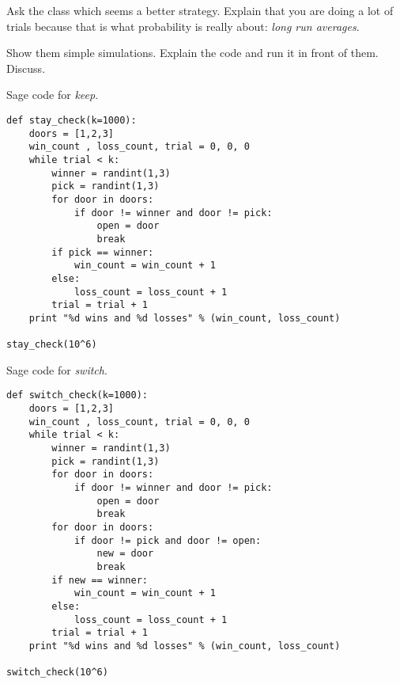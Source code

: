 \documentclass[12pt]{amsart}
\theoremstyle{definition}
\begin{document}
Ask the class which seems a better strategy. 
Explain that you are doing a lot of trials because that is what probability is really about: \emph{long run averages}.

Show them simple simulations. 
Explain the code and run it in front of them. 
Discuss.

Sage code for \emph{keep}.

\begin{verbatim}
def stay_check(k=1000):
    doors = [1,2,3]
    win_count , loss_count, trial = 0, 0, 0
    while trial < k:
        winner = randint(1,3)
        pick = randint(1,3)
        for door in doors:
            if door != winner and door != pick:
                open = door
                break
        if pick == winner:
            win_count = win_count + 1
        else:
            loss_count = loss_count + 1
        trial = trial + 1
    print "%d wins and %d losses" % (win_count, loss_count)

stay_check(10^6)
\end{verbatim}

\clearpage

Sage code for \emph{switch}.

\begin{verbatim}
def switch_check(k=1000):
    doors = [1,2,3]
    win_count , loss_count, trial = 0, 0, 0
    while trial < k:
        winner = randint(1,3)
        pick = randint(1,3)
        for door in doors:
            if door != winner and door != pick:
                open = door
                break
        for door in doors:
            if door != pick and door != open:
                new = door
                break
        if new == winner:
            win_count = win_count + 1
        else:
            loss_count = loss_count + 1
        trial = trial + 1
    print "%d wins and %d losses" % (win_count, loss_count)

switch_check(10^6)
\end{verbatim}
\end{document}
